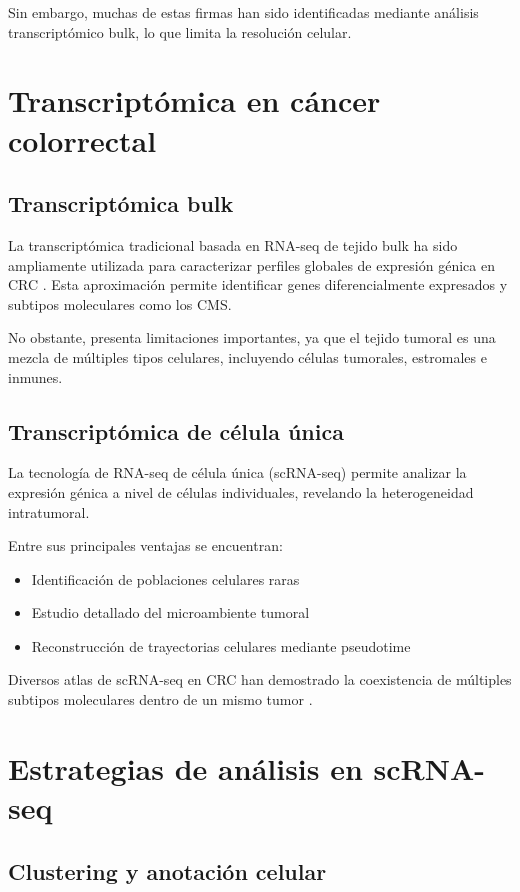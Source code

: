 \documentclass[11pt]{article}
\begin{document}
Sin embargo, muchas de estas firmas han sido identificadas mediante análisis transcriptómico bulk, lo que limita la resolución celular.

\section{Transcriptómica en cáncer colorrectal}

\subsection{Transcriptómica bulk}

La transcriptómica tradicional basada en RNA-seq de tejido bulk ha sido ampliamente utilizada para caracterizar perfiles globales de expresión génica en CRC \cite{ref10}. Esta aproximación permite identificar genes diferencialmente expresados y subtipos moleculares como los CMS.

No obstante, presenta limitaciones importantes, ya que el tejido tumoral es una mezcla de múltiples tipos celulares, incluyendo células tumorales, estromales e inmunes.

\subsection{Transcriptómica de célula única}

La tecnología de RNA-seq de célula única (scRNA-seq) permite analizar la expresión génica a nivel de células individuales, revelando la heterogeneidad intratumoral.

Entre sus principales ventajas se encuentran:

\begin{itemize}
\item Identificación de poblaciones celulares raras
\item Estudio detallado del microambiente tumoral
\item Reconstrucción de trayectorias celulares mediante pseudotime
\end{itemize}

Diversos atlas de scRNA-seq en CRC han demostrado la coexistencia de múltiples subtipos moleculares dentro de un mismo tumor \cite{ref2}.

\section{Estrategias de análisis en scRNA-seq}

\subsection{Clustering y anotación celular}
\end{document}
